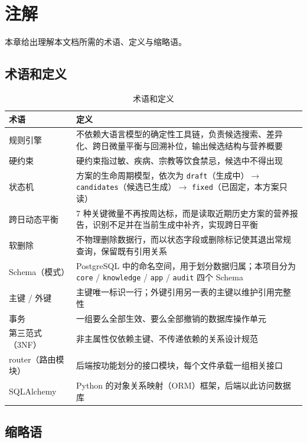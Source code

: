 \documentclass[12pt,a4paper]{ctexart}
\begin{document}
\section{注解}

本章给出理解本文档所需的术语、定义与缩略语。

\subsection{术语和定义}

\begin{xltabular}{\linewidth}{Q{3.0cm}L}
\caption{术语和定义} \\
\toprule
\textbf{术语} & \textbf{定义} \\
\midrule
\endhead
规则引擎 & 不依赖大语言模型的确定性工具链，负责候选搜索、差异化、跨日微量平衡与回溯补位，输出候选结构与营养概要 \\
硬约束 & 硬约束指过敏、疾病、宗教等饮食禁忌，候选中不得出现 \\
状态机 & 方案的生命周期模型，依次为 \texttt{draft}（生成中）$\rightarrow$ \texttt{candidates}（候选已生成）$\rightarrow$ \texttt{fixed}（已固定，本方案只读） \\
跨日动态平衡 & 7 种关键微量不再按周达标，而是读取近期历史方案的营养报告，识别不足并在当前生成中补齐，实现跨日平衡 \\
软删除 & 不物理删除数据行，而以状态字段或删除标记使其退出常规查询，保留既有引用关系 \\
Schema（模式） & PostgreSQL 中的命名空间，用于划分数据归属；本项目分为 \texttt{core} / \texttt{knowledge} / \texttt{app} / \texttt{audit} 四个 Schema \\
主键 / 外键 & 主键唯一标识一行；外键引用另一表的主键以维护引用完整性 \\
事务 & 一组要么全部生效、要么全部撤销的数据库操作单元 \\
第三范式（3NF） & 非主属性仅依赖主键、不传递依赖的关系设计规范 \\
router（路由模块） & 后端按功能划分的接口模块，每个文件承载一组相关接口 \\
SQLAlchemy & Python 的对象关系映射（ORM）框架，后端以此访问数据库 \\
\bottomrule
\end{xltabular}

\subsection{缩略语}
\end{document}
